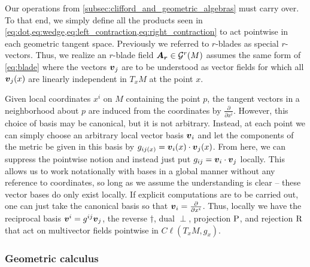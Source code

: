 Our operations from \cref{subsec:clifford_and_geometric_algebras} must carry over. To that end, we simply define all the products seen in \cref{eq:dot,eq:wedge,eq:left_contraction,eq:right_contraction} to act pointwise in each geometric tangent space. Previously we referred to $r$-blades as special $r$-vectors. Thus, we realize an $r$-blade field $\boldsymbol{A_r} \in \mathcal{G}^r(M)$ assumes the same form of \cref{eq:blade} where the vectors $\boldsymbol{v}_j$ are to be understood as vector fields for which all $\boldsymbol{v}_j(x)$ are linearly independent in $T_xM$ at the point $x$.

Given local coordinates $x^i$ on $M$ containing the point $p$, the tangent vectors in a neighborhood about $p$ are induced from the coordinates by $\frac{\partial}{\partial x^i}$. However, this choice of basis may be canonical, but it is not arbitrary. Instead, at each point we can simply choose an arbitrary local vector basis $\boldsymbol{v}_i$ and let the components of the metric be given in this basis by $g_{{ij}(x)} = \boldsymbol{v}_i(x)\cdot \boldsymbol{v}_j(x)$. From here, we can suppress the pointwise notion and instead just put $g_{ij}=\boldsymbol{v}_i\cdot \boldsymbol{v}_j$ locally. This allows us to work notationally with bases in a global manner without any reference to coordinates, so long as we assume the understanding is clear -- these vector bases do only exist locally. If explicit computations are to be carried out, one can just take the canonical basis so that $\boldsymbol{v}_i=\frac{\partial}{\partial x^i}$. Thus, locally we have the reciprocal basis $\boldsymbol{v}^i=g^{ij}\boldsymbol{v}_j$, the reverse $\dagger$, dual $\perp$, projection $\operatorname{P}$, and rejection $\operatorname{R}$ that act on multivector fields pointwise in $C\ell(T_xM,g_x)$. 

\subsubsection{Geometric calculus}


